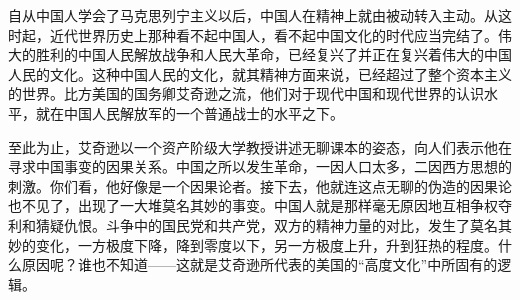 \documentclass[UTF-8, a5paper, 12pt]{ctexart}
\begin{document}
自从中国人学会了马克思列宁主义以后，中国人在精神上就由被动转入主动。从这时起，近代世界历史上那种看不起中国人，看不起中国文化的时代应当完结了。伟大的胜利的中国人民解放战争和人民大革命，已经复兴了并正在复兴着伟大的中国人民的文化。这种中国人民的文化，就其精神方面来说，已经超过了整个资本主义的世界。比方美国的国务卿艾奇逊之流，他们对于现代中国和现代世界的认识水平，就在中国人民解放军的一个普通战士的水平之下。

至此为止，艾奇逊以一个资产阶级大学教授讲述无聊课本的姿态，向人们表示他在寻求中国事变的因果关系。中国之所以发生革命，一因人口太多，二因西方思想的刺激。你们看，他好像是一个因果论者。接下去，他就连这点无聊的伪造的因果论也不见了，出现了一大堆莫名其妙的事变。中国人就是那样毫无原因地互相争权夺利和猜疑仇恨。斗争中的国民党和共产党，双方的精神力量的对比，发生了莫名其妙的变化，一方极度下降，降到零度以下，另一方极度上升，升到狂热的程度。什么原因呢？谁也不知道——这就是艾奇逊所代表的美国的“高度文化”中所固有的逻辑。
\end{document}
